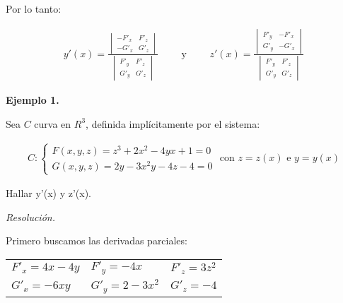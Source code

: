 Por lo tanto:

\begin{align*}
    y'(x) = \frac{\begin{vmatrix}
                          -F'_x & F'_z \\
                          -G'_x & G'_z
                      \end{vmatrix}}{\begin{vmatrix}
                                         F'_y & F'_z \\
                                         G'_y & G'_z
                                     \end{vmatrix}}
    \qquad\text{ y }\qquad
    z'(x) = \frac{
        \begin{vmatrix}
            F'_y & -F'_x \\
            G'_y & -G'_x
        \end{vmatrix}}{\begin{vmatrix}
                           F'_y & F'_z \\
                           G'_y & G'_z
                       \end{vmatrix}}
\end{align*}

\vspace{.5cm}
\textbf{Ejemplo 1.}

Sea \(C\) curva en \(R^{3}\),
definida implícitamente por el sistema:

\begin{align*} C:
    \begin{cases}
        F(x,y,z) = z^{3} + 2x^{2} - 4yx + 1 = 0 \\
        G(x,y,z) = 2y - 3x^{2}y - 4z - 4 = 0
    \end{cases}
    \text{ con } z = z(x) \text{ e } y = y(x)
\end{align*}

Hallar y'(x) y z'(x).

\textit{Resolución.}

Primero buscamos las derivadas parciales:

\begin{table*}[h!]
    \centering
    \begin{tabular}{lll}
        $F'_x = 4x - 4y$ & $F'_y = -4x$        & $F'_z = 3z^{2}$ \\
        $G'_x = - 6xy$   & $G'_y = 2 - 3x^{2}$ & $G'_z = -4 $    \\
    \end{tabular}
\end{table*}

